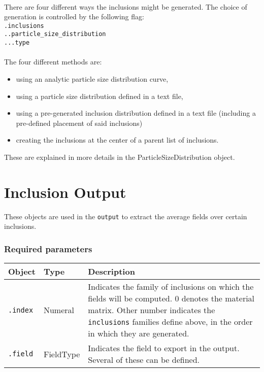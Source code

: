 \documentclass[10pt]{article}
\begin{document}
\paragraph{} There are four different ways the inclusions might be generated. The choice of generation is controlled by the following flag:\\
\verb+.inclusions+\\
\verb+..particle_size_distribution+\\
\verb+...type+

\paragraph{} The four different methods are:
\begin{itemize}
	\item using an analytic particle size distribution curve,
	\item using a particle size distribution defined in a text file,
	\item using a pre-generated inclusion distribution defined in a text file (including a pre-defined placement of said inclusions)
	\item creating the inclusions at the center of a parent list of inclusions.
\end{itemize}

These are explained in more details in the ParticleSizeDistribution object.

\section{Inclusion Output}

These objects are used in the \verb+output+ to extract the average fields over certain inclusions.

\subsubsection*{Required parameters}

\begin{tabularx}{\textwidth}{llX}
\hline 
Object & Type & Description \\ 
\hline 
\verb+.index+ & Numeral & Indicates the family of inclusions on which the fields will be computed. 0 denotes the material matrix. Other number indicates the \verb+inclusions+ families define above, in the order in which they are generated. \\ 
\verb+.field+ & FieldType & Indicates the field to export in the output. Several of these can be defined.\\
\hline 
\end{tabularx}
\end{document}
